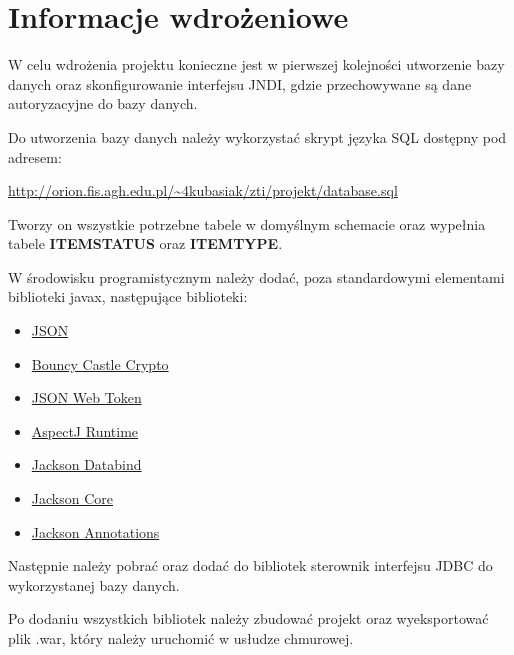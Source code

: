 \documentclass[11pt, titlepage]{article}
\begin{document}
\section{Informacje wdrożeniowe}

\hspace{11pt} W celu wdrożenia projektu konieczne jest w pierwszej kolejności utworzenie bazy danych oraz skonfigurowanie interfejsu JNDI, gdzie przechowywane są dane autoryzacyjne do bazy danych.

Do utworzenia bazy danych należy wykorzystać skrypt języka SQL dostępny pod adresem:

\begin{center}
\begin{adjustwidth}{-0.0cm}{}
\url{http://orion.fis.agh.edu.pl/~4kubasiak/zti/projekt/database.sql}
\end{adjustwidth}
\end{center}

Tworzy on wszystkie potrzebne tabele w domyślnym schemacie oraz wypełnia tabele \textbf{ITEMSTATUS} oraz \textbf{ITEMTYPE}.

W środowisku programistycznym należy dodać, poza standardowymi elementami biblioteki javax, następujące biblioteki:
\begin{itemize}
\item \href{https://mvnrepository.com/artifact/org.json/json/20180130}{JSON}
\item \href{https://mvnrepository.com/artifact/org.bouncycastle/bcprov-jdk15on/1.56}{Bouncy Castle Crypto}
\item \href{https://mvnrepository.com/artifact/io.jsonwebtoken/jjwt/0.9.0}{JSON Web Token}
\item \href{https://mvnrepository.com/artifact/org.aspectj/aspectjrt/1.6.9}{AspectJ Runtime}
\item \href{https://mvnrepository.com/artifact/com.fasterxml.jackson.core/jackson-databind/2.8.9}{Jackson Databind}
\item \href{https://mvnrepository.com/artifact/com.fasterxml.jackson.core/jackson-core/2.8.9}{Jackson Core}
\item \href{https://mvnrepository.com/artifact/com.fasterxml.jackson.core/jackson-annotations/2.8.0}{Jackson Annotations}
\end{itemize}

Następnie należy pobrać oraz dodać do bibliotek sterownik interfejsu JDBC do wykorzystanej bazy danych.

Po dodaniu wszystkich bibliotek należy zbudować projekt oraz wyeksportować plik .war, który należy uruchomić w usłudze chmurowej.
\end{document}
